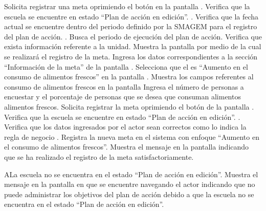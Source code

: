 \begin{UCtrayectoria}
	\UCpaso[\UCactor] Solicita registrar una meta oprimiendo el botón  en la pantalla .
	\UCpaso[\UCsist] Verifica que la escuela se encuentre en  estado ``Plan de acción en edición''. .
    \UCpaso[\UCsist] Verifica que la fecha actual se encuentre dentro del periodo definido por la SMAGEM para el registro del plan de acción. .	
	\UCpaso[\UCsist] Busca el periodo de ejecución del plan de acción.
	\UCpaso[\UCsist] Verifica que exista información referente a la unidad. 
	\UCpaso[\UCsist] Muestra la pantalla  por medio de la cual se realizará el registro de la meta.
	\UCpaso[\UCactor] Ingresa los datos correspondientes a la sección ``Información de la meta'' de la pantalla . \label{cupcr1:ingresaDatos}
	\UCpaso[\UCactor] Selecciona que el  es ``Aumento en el consumo de alimentos frescos'' en la pantalla . 
	\UCpaso[\UCsist] Muestra los campos referentes al consumo de alimentos frescos en la pantalla 
	\UCpaso[\UCactor] Ingresa el número de personas a encuestar y el porcentaje de personas que se desea que consuman alimentos alimentos frescos.
	\UCpaso[\UCactor] Solicita registrar la meta oprimiendo el botón  de la pantalla . 
	\UCpaso[\UCsist] Verifica que la escuela se encuentre en  estado ``Plan de acción en edición''. .	
	\UCpaso[\UCsist] Verifica que los datos ingresados por el actor sean correctos como lo indica la regla de negocio .   
	\UCpaso[\UCsist] Registra la nueva meta en el sistema con enfoque ``Aumento en el consumo de alimentos frescos''.
	\UCpaso[\UCsist] Muestra el mensaje  en la pantalla  indicando que se ha realizado el registro de la meta satisfactoriamente. \label{cupcr1:muestraMensaje}
\end{UCtrayectoria}
 
 
\begin{UCtrayectoriaA}{A}{La escuela no se encuentra en el estado ``Plan de acción en edición''.}
    \UCpaso[\UCsist] Muestra el mensaje  en la pantalla en que se encuentre navegando el actor indicando que no puede administrar los objetivos del plan de acción debido a que la escuela no se encuentra en el estado ``Plan de acción en edición''. 
 \end{UCtrayectoriaA}
 

